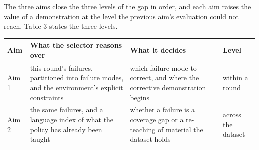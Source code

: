 \documentclass[
  11pt,
]{article}
\begin{document}
The three aims close the three levels of the gap in order, and each aim
raises the value of a demonstration at the level the previous aim's
evaluation could not reach. Table 3 states the three levels.

\begin{longtable}[]{@{}llll@{}}
\toprule
\begin{minipage}[b]{0.06\columnwidth}\raggedright
Aim\strut
\end{minipage} & \begin{minipage}[b]{0.37\columnwidth}\raggedright
What the selector reasons over\strut
\end{minipage} & \begin{minipage}[b]{0.28\columnwidth}\raggedright
What it decides\strut
\end{minipage} & \begin{minipage}[b]{0.16\columnwidth}\raggedright
Level\strut
\end{minipage}\tabularnewline
\midrule
\endhead
\begin{minipage}[t]{0.06\columnwidth}\raggedright
Aim 1\strut
\end{minipage} & \begin{minipage}[t]{0.37\columnwidth}\raggedright
this round's failures, partitioned into failure modes, and the
environment's explicit constraints\strut
\end{minipage} & \begin{minipage}[t]{0.28\columnwidth}\raggedright
which failure mode to correct, and where the corrective demonstration
begins\strut
\end{minipage} & \begin{minipage}[t]{0.16\columnwidth}\raggedright
within a round\strut
\end{minipage}\tabularnewline
\begin{minipage}[t]{0.06\columnwidth}\raggedright
Aim 2\strut
\end{minipage} & \begin{minipage}[t]{0.37\columnwidth}\raggedright
the same failures, and a language index of what the policy has already
been taught\strut
\end{minipage} & \begin{minipage}[t]{0.28\columnwidth}\raggedright
whether a failure is a coverage gap or a re-teaching of material the
dataset holds\strut
\end{minipage} & \begin{minipage}[t]{0.16\columnwidth}\raggedright
across the dataset\strut
\end{minipage}\tabularnewline

\end{longtable}
\end{document}
